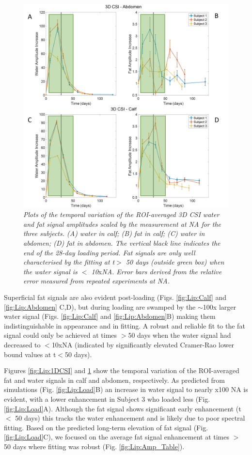 \begin{figure}
    \centering
    \includegraphics[width=1\textwidth]{Figures/Lipid/3DCSI_Amplitude.png}
    \caption{\textit{Plots of the temporal variation of the \ac{ROI}-averaged 3D \ac{CSI} water and fat signal amplitudes scaled by the measurement at \ac{NA} for the three subjects. (A) water in calf; (B) fat in calf; (C) water in abdomen; (D) fat in abdomen. The vertical black line indicates the end of the 28-day loading period. Fat signals are only well characterised by the fitting at t$>$ 50 days (outside green box) when the water signal is $<$ 10}x\textit{\ac{NA}.  Error bars derived from the relative error measured from repeated experiments at NA.}}
    \label{fig:Lip:3DCSI}
\end{figure}

Superficial fat signals are also evident post-loading (Figs. \ref{fig:Lip:Calf} and \ref{fig:Lip:Abdomen} C,D), but during loading are swamped by the $\sim$100x larger water signal (Figs. \ref{fig:Lip:Calf} and \ref{fig:Lip:Abdomen}B) making them indistinguishable in appearance and in fitting. A robust and reliable fit to the fat signal could only be achieved at times $>$50 days when the water signal had decreased to $<$10x\ac{NA} (indicated by significantly elevated Cramer-Rao lower bound values at t$<$50 days).

Figures \ref{fig:Lip:1DCSI} and \ref{fig:Lip:3DCSI} show the temporal variation of the \ac{ROI}-averaged fat and water signals in calf and abdomen, respectively. As predicted from simulations (Fig. \ref{fig:Lip:Load}B) an increase in water signal to nearly x100 \ac{NA} is evident, with a lower enhancement in Subject 3 who loaded less (Fig. \ref{fig:Lip:Load}A). Although the fat signal shows significant early enhancement (t $<$ 50 days) this tracks the water enhancement and is likely due to poor spectral fitting. Based on the predicted long-term elevation of fat signal (Fig. \ref{fig:Lip:Load}C), we focused on the average fat signal enhancement at times $>$ 50 days where fitting was robust (Fig. \ref{fig:Lip:Amp_Table}). 

